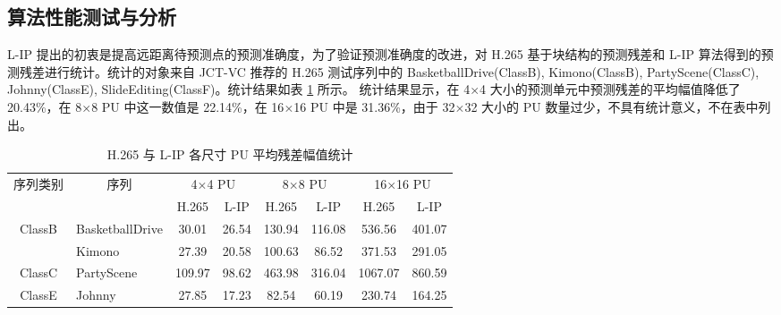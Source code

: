 \subsection{算法性能测试与分析}
\label{cha:L-IPTest}
L-IP 提出的初衷是提高远距离待预测点的预测准确度，为了验证预测准确度的改进，对 H.265 基于块结构的预测残差和 L-IP 算法得到的预测残差进行统计。统计的对象来自 JCT-VC 推荐的 H.265 测试序列中的 BasketballDrive(ClassB), Kimono(ClassB), PartyScene(ClassC), Johnny(ClassE), SlideEditing(ClassF)。统计结果如表 \ref{tab:L-IPResidualReduction} 所示。
统计结果显示，在 4$\times$4 大小的预测单元中预测残差的平均幅值降低了 20.43\%，在 8$\times$8 PU 中这一数值是 22.14\%，在 16$\times$16 PU 中是 31.36\%，由于 32$\times$32 大小的 PU 数量过少，不具有统计意义，不在表中列出。
\begin{table}[hbt]
    \centering
    \caption{H.265 与 L-IP 各尺寸 PU 平均残差幅值统计}
    \label{tab:L-IPResidualReduction}
    \begin{tabular}{@{}clcccccc@{}}
        \toprule
        \multirow{2}{*}{序列类别}                & \multicolumn{1}{c}{\multirow{2}{*}{序列}} & \multicolumn{2}{c}{4$\times$4 PU} & \multicolumn{2}{c}{8$\times$8 PU} & \multicolumn{2}{c}{16$\times$16 PU}                             \\ \cmidrule(l){3-8}
                                                 & \multicolumn{1}{c}{}                      & H.265                             & L-IP                              & H.265                               & L-IP   & H.265   & L-IP   \\ \midrule
        \multirow{2}{*}{ClassB}                  & BasketballDrive                           & 30.01                             & 26.54                             & 130.94                              & 116.08 & 536.56  & 401.07 \\
                                                 & Kimono                                    & 27.39                             & 20.58                             & 100.63                              & 86.52  & 371.53  & 291.05 \\
        ClassC                                   & PartyScene                                & 109.97                            & 98.62                             & 463.98                              & 316.04 & 1067.07 & 860.59 \\
        ClassE                                   & Johnny                                    & 27.85                             & 17.23                             & 82.54                               & 60.19  & 230.74  & 164.25 \\

\end{tabular}
\end{table}
